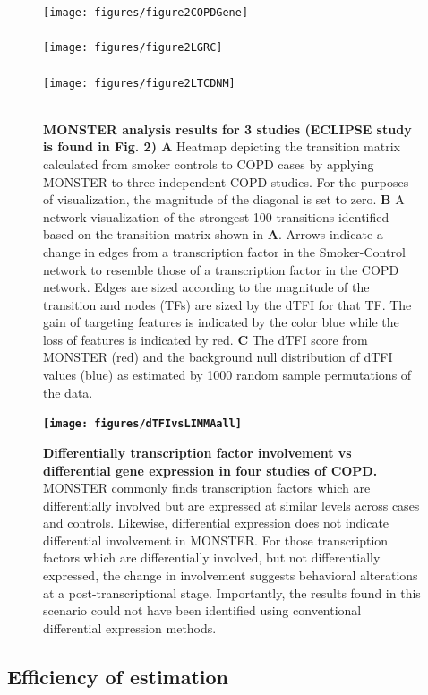 \documentclass[9pt,twocolumn,twoside]{pnas-new}
\begin{document}
\begin{figure}
\texttt{[image: figures/figure2COPDGene]}\\
\\
\texttt{[image: figures/figure2LGRC]}\\
\\
\texttt{[image: figures/figure2LTCDNM]}\\
\\

\caption{\textbf{MONSTER analysis results for 3 studies (ECLIPSE study is found
in Fig. 2) A }Heatmap depicting the transition matrix calculated from
smoker controls to COPD cases by applying MONSTER to three independent
COPD studies. For the purposes of visualization, the magnitude of
the diagonal is set to zero. \textbf{B} A network visualization of
the strongest 100 transitions identified based on the transition matrix
shown in \textbf{A}. Arrows indicate a change in edges from a transcription
factor in the Smoker-Control network to resemble those of a transcription
factor in the COPD network. Edges are sized according to the magnitude
of the transition and nodes (TFs) are sized by the dTFI for that TF.
The gain of targeting features is indicated by the color blue while
the loss of features is indicated by red. \textbf{C} The dTFI score
from MONSTER (red) and the background null distribution of dTFI values
(blue) as estimated by 1000 random sample permutations of the data.}
\end{figure}


\begin{figure}
\textbf{\texttt{[image: figures/dTFIvsLIMMAall]}
}\caption{\textbf{Differentially transcription factor involvement vs differential
gene expression in four studies of COPD.} MONSTER commonly finds transcription
factors which are differentially involved but are expressed at similar
levels across cases and controls. Likewise, differential expression
does not indicate differential involvement in MONSTER. For those transcription
factors which are differentially involved, but not differentially
expressed, the change in involvement suggests behavioral alterations
at a post-transcriptional stage. Importantly, the results found in
this scenario could not have been identified using conventional differential
expression methods.}

\label{fig:sup_expression}
\end{figure}


\subsection*{Efficiency of estimation}
\end{document}
